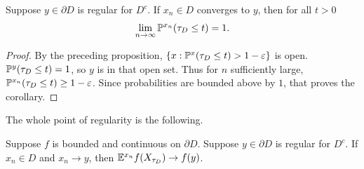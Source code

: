 \begin{corollary}\label{cor:ch2_1.11}
Suppose $y \in \partial D$ is regular for $D^c$. If $x_n \in D$ converges to $y$, then for all $t > 0$
\[
    \lim_{n\to\infty} \P^{x_n}(\tau_D \leq t) = 1.
\]
\end{corollary}

\begin{proof}
By the preceding proposition, $\{x: \P^x(\tau_D \leq t) > 1-\epsilon\}$ is open. $\P^y(\tau_D \leq t) = 1$, so $y$ is in that open set. Thus for $n$ sufficiently large, $\P^{x_n}(\tau_D \leq t) \geq 1-\epsilon$. Since probabilities are bounded above by $1$, that proves the corollary.
\end{proof}

The whole point of regularity is the following.

\begin{proposition}\label{prop:ch2_1.12}
Suppose $f$ is bounded and continuous on $\partial D$. Suppose $y \in \partial D$ is regular for $D^c$. If $x_n \in D$ and $x_n \to y$, then $\E^{x_n}f(X_{\tau_D}) \to f(y)$.
\end{proposition}

